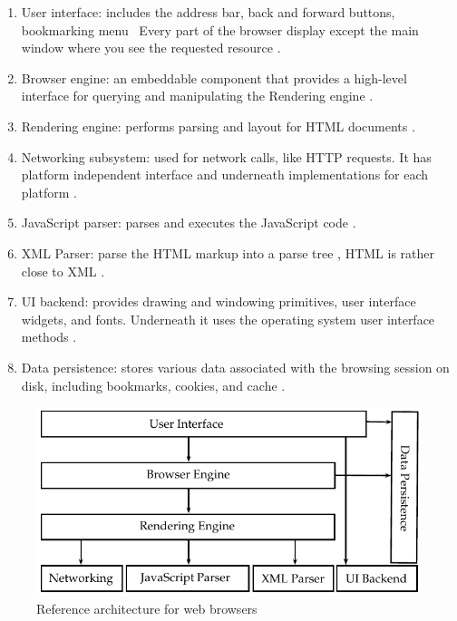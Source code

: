 \begin{enumerate}
  \item User interface: includes the address bar, back and forward buttons, bookmarking menu \etc\ Every part of the browser display except the main window where you see the requested resource \cite{Grosskurth2005}.
  \item Browser engine: an embeddable component that provides a high-level interface for querying and manipulating the Rendering engine \cite{Grosskurth2005} \cite{Rocks2013}.
  \item Rendering engine: performs parsing and layout for HTML documents \cite{Grosskurth2005} \cite{Rocks2013}.
  \item Networking subsystem: used for network calls, like HTTP requests. It has platform independent interface and underneath implementations for each platform \cite{Grosskurth2005} \cite{Rocks2013}.
  \item JavaScript parser: parses and executes the JavaScript code \cite{Grosskurth2005}.
  \item XML Parser: parse the HTML markup into a parse tree \cite{Hickson2013}, HTML is rather close to XML \cite{Rocks2013} \cite{Hickson2013}.
  \item UI backend: provides drawing and windowing primitives, user interface widgets, and fonts. Underneath it uses the operating system user interface methods \cite{Grosskurth2005}.
  \item Data persistence: stores various data associated with the browsing session on disk, including bookmarks, cookies, and cache \cite{Grosskurth2005} \cite{Rocks2013}.
\end{enumerate}

\begin{figure}[!htb]
  \centering
  \includegraphics{chapters/basic_concepts/web_architecture.pdf}
  \caption{Reference architecture for web browsers}
  \label{figure:web_architecture}
\end{figure}

